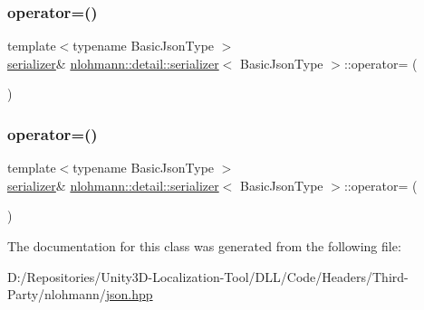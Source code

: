 \subsubsection{\texorpdfstring{operator=()}{operator=()}\hspace{0.1cm}{\footnotesize\ttfamily [1/2]}}
{\footnotesize\ttfamily template$<$typename Basic\+Json\+Type $>$ \\
\mbox{\hyperlink{classnlohmann_1_1detail_1_1serializer}{serializer}}\& \mbox{\hyperlink{classnlohmann_1_1detail_1_1serializer}{nlohmann\+::detail\+::serializer}}$<$ Basic\+Json\+Type $>$\+::operator= (\begin{DoxyParamCaption}\item[{const \mbox{\hyperlink{classnlohmann_1_1detail_1_1serializer}{serializer}}$<$ Basic\+Json\+Type $>$ \&}]{ }\end{DoxyParamCaption})\hspace{0.3cm}{\ttfamily [delete]}}

\mbox{\label{classnlohmann_1_1detail_1_1serializer_acaafe3436ee5fb74777eb4132a88c513}} 
\subsubsection{\texorpdfstring{operator=()}{operator=()}\hspace{0.1cm}{\footnotesize\ttfamily [2/2]}}
{\footnotesize\ttfamily template$<$typename Basic\+Json\+Type $>$ \\
\mbox{\hyperlink{classnlohmann_1_1detail_1_1serializer}{serializer}}\& \mbox{\hyperlink{classnlohmann_1_1detail_1_1serializer}{nlohmann\+::detail\+::serializer}}$<$ Basic\+Json\+Type $>$\+::operator= (\begin{DoxyParamCaption}\item[{\mbox{\hyperlink{classnlohmann_1_1detail_1_1serializer}{serializer}}$<$ Basic\+Json\+Type $>$ \&\&}]{ }\end{DoxyParamCaption})\hspace{0.3cm}{\ttfamily [delete]}}



The documentation for this class was generated from the following file\+:\begin{DoxyCompactItemize}
\item 
D\+:/\+Repositories/\+Unity3\+D-\/\+Localization-\/\+Tool/\+D\+L\+L/\+Code/\+Headers/\+Third-\/\+Party/nlohmann/\mbox{\hyperlink{json_8hpp}{json.\+hpp}}\end{DoxyCompactItemize}
